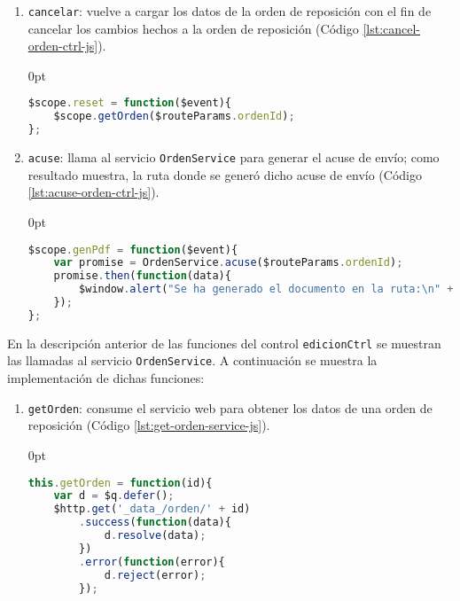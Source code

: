 \begin{enumerate}
\begin{enumerate}
\begin{adjustwidth}{\listingfixlargewidth}{0pt}
\begin{lstlisting}[language=Javascript, caption={Función del controlador de \textit{AngularJS} para actualizar una orden de reposición.}, captionpos=b, label={lst:update-orden-ctrl-js}]
$scope.actualizar = function($event){
	var promise = OrdenService.update($scope.orden);
	promise.then(function(data){
		$scope.actualizado = data;
	});
};
\end{lstlisting}
\end{adjustwidth}
	\item \texttt{cancelar}: vuelve a cargar los datos de la orden de reposición con el fin de cancelar los cambios hechos a la orden de reposición (Código \ref{lst:cancel-orden-ctrl-js}).
\begin{adjustwidth}{\listingfixlargewidth}{0pt}
\begin{lstlisting}[language=Javascript, caption={Función del controlador de \textit{AngularJS} para cancelar los cambios en una orden de reposición.}, captionpos=b, label={lst:cancel-orden-ctrl-js}]
$scope.reset = function($event){
	$scope.getOrden($routeParams.ordenId);
};
\end{lstlisting}
\end{adjustwidth}
	\item \texttt{acuse}: llama al servicio \texttt{OrdenService} para generar el acuse de envío; como resultado muestra, la ruta donde se generó dicho acuse de envío (Código \ref{lst:acuse-orden-ctrl-js}).
\begin{adjustwidth}{\listingfixlargewidth}{0pt}
\begin{lstlisting}[language=Javascript, caption={Función del controlador de \textit{AngularJS} para generar el acuse de envío de la orden de reposición.}, captionpos=b, label={lst:acuse-orden-ctrl-js}]
$scope.genPdf = function($event){
	var promise = OrdenService.acuse($routeParams.ordenId);
	promise.then(function(data){
		$window.alert("Se ha generado el documento en la ruta:\n" + data);
	});
};
\end{lstlisting}
\end{adjustwidth}
\end{enumerate}
En la descripción anterior de las funciones del control \texttt{edicionCtrl} se muestran las llamadas al servicio \texttt{OrdenService}. A continuación se muestra la implementación de dichas funciones:
\begin{enumerate}
	\item \texttt{getOrden}: consume el servicio web para obtener los datos de una orden de reposición (Código \ref{lst:get-orden-service-js}).
\begin{adjustwidth}{\listingfixlargewidth}{0pt}
\begin{lstlisting}[language=Javascript, caption={Función para consumir el servicio web que obtiene los datos de una orden de reposición.}, captionpos=b, label={lst:get-orden-service-js}]
this.getOrden = function(id){
	var d = $q.defer();
	$http.get('_data_/orden/' + id)
		.success(function(data){
			d.resolve(data);
		})
		.error(function(error){
			d.reject(error);
		});
	

\end{lstlisting}
\end{adjustwidth}
\end{enumerate}
\end{enumerate}
